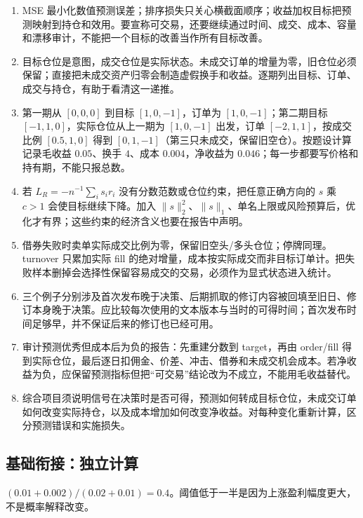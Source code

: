 
\begin{enumerate}[leftmargin=*]
  \item MSE 最小化数值预测误差；排序损失只关心横截面顺序；收益加权目标把预测映射到持仓和效用。要宣称可交易，还要继续通过时间、成交、成本、容量和漂移审计，不能把一个目标的改善当作所有目标改善。
  \item 目标仓位是意图，成交仓位是实际状态。未成交订单的增量为零，旧仓位必须保留；直接把未成交资产归零会制造虚假换手和收益。逐期列出目标、订单、成交与持仓，有助于看清这一递推。
  \item 第一期从 $[0,0,0]$ 到目标 $[1,0,-1]$，订单为 $[1,0,-1]$；第二期目标 $[-1,1,0]$，实际仓位从上一期为 $[1,0,-1]$ 出发，订单 $[-2,1,1]$，按成交比例 $[0.5,1,0]$ 得到 $[0,1,-1]$（第三只未成交，保留旧空仓）。按题设计算记录毛收益 $0.05$、换手 $4$、成本 $0.004$，净收益为 $0.046$；每一步都要写价格和持有期，不能只报总数。
  \item 若 $L_R=-n^{-1}\sum_i s_ir_i$ 没有分数范数或仓位约束，把任意正确方向的 $s$ 乘 $c>1$ 会使目标继续下降。加入 $\|s\|_2^2$、$\|s\|_1$、单名上限或风险预算后，优化才有界；这些约束的经济含义也要在报告中声明。
  \item 借券失败时卖单实际成交比例为零，保留旧空头/多头仓位；停牌同理。turnover 只累加实际 fill 的绝对增量，成本按实际成交而非目标订单计。把失败样本删掉会选择性保留容易成交的交易，必须作为显式状态进入统计。
  \item 三个例子分别涉及首次发布晚于决策、后期抓取的修订内容被回填至旧日、修订本身晚于决策。应比较每次使用的文本版本与当时的可得时间；首次发布时间足够早，并不保证后来的修订也已经可用。
  \item 审计预测优秀但成本后为负的报告：先重建分数到 target，再由 order/fill 得到实际仓位，最后逐日扣佣金、价差、冲击、借券和未成交机会成本。若净收益为负，应保留预测指标但把“可交易”结论改为不成立，不能用毛收益替代。
  \item 综合项目须说明信号在决策时是否可得，预测如何转成目标仓位，未成交订单如何改变实际持仓，以及成本增加如何改变净收益。对每种变化重新计算，区分预测错误和实施损失。
\end{enumerate}

\subsection*{基础衔接：独立计算}
$(0.01+0.002)/(0.02+0.01)=0.4$。阈值低于一半是因为上涨盈利幅度更大，不是概率解释改变。
